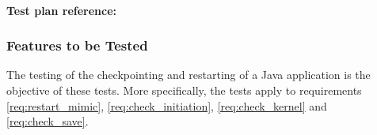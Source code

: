 

\\
\noindent\textbf{Test plan reference: } %



\subsubsection{Features to be Tested}
The testing of the checkpointing and restarting of a Java application
is the objective of these tests. More specifically, the tests apply to
requirements \ref{req:restart_mimic}, \ref{req:check_initiation},
\ref{req:check_kernel} and \ref{req:check_save}.


